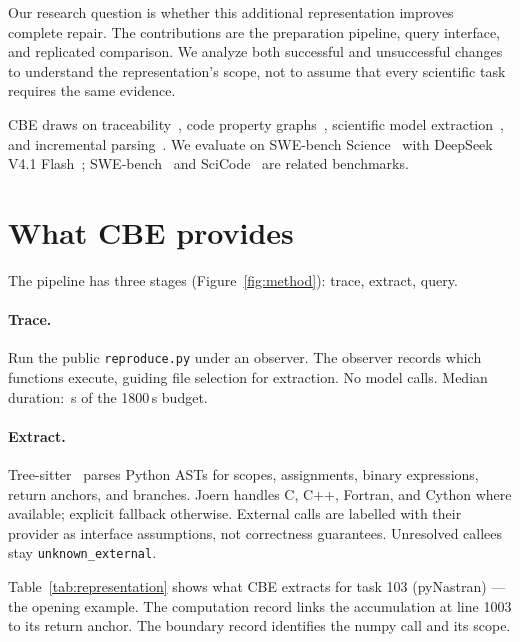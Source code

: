 \documentclass[11pt,a4paper,twocolumn]{article}
\begin{document}
Our research question is whether this additional representation improves complete repair. The contributions are the preparation pipeline, query interface, and replicated comparison. We analyze both successful and unsuccessful changes to understand the representation's scope, not to assume that every scientific task requires the same evidence.

CBE draws on traceability~\citep{niu2023ablots,niu2023rat,niu2025tvr,pan2025coverage}, code property graphs~\citep{yamaguchi2014cpg}, scientific model extraction~\citep{pyarelal2020automates,skema2024gromet}, and incremental parsing~\citep{treesitter2024}. We evaluate on SWE-bench Science~\citep{xu2026science} with DeepSeek V4.1 Flash~\citep{deepseek2026}; SWE-bench~\citep{jimenez2024swebench,yang2024swebenchverified} and SciCode~\citep{tian2024scicode} are related benchmarks.

\section{What CBE provides}
\label{sec:method}

The pipeline has three stages (Figure~\ref{fig:method}): trace, extract, query.

\paragraph{Trace.}
Run the public \texttt{reproduce.py} under an observer. The observer records which functions execute, guiding file selection for extraction. No model calls. Median duration: \MedianPreparation{}\,s of the 1800\,s budget.

\paragraph{Extract.}
Tree-sitter~\citep{treesitter2024} parses Python ASTs for scopes, assignments, binary expressions, return anchors, and branches. Joern handles C, C++, Fortran, and Cython where available; explicit fallback otherwise. External calls are labelled with their provider as interface assumptions, not correctness guarantees. Unresolved callees stay \texttt{unknown\_external}.

Table~\ref{tab:representation} shows what CBE extracts for task 103 (pyNastran) --- the opening example. The computation record links the accumulation at line 1003 to its return anchor. The boundary record identifies the numpy call and its scope.
\end{document}
